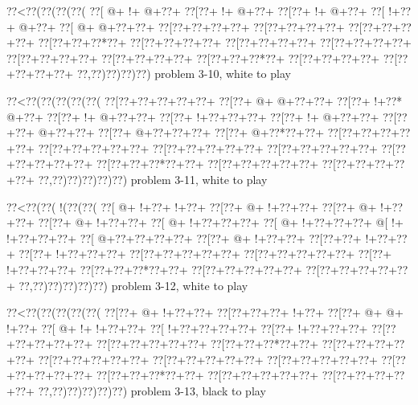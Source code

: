 \vbox{\vbox{\goo
\0??<\0??(\0??(\0??(\0??(
\0??[\- @+\- !+\- @+\0??+
\0??[\0??+\- !+\- @+\0??+
\0??[\0??+\- !+\- @+\0??+
\0??[\- !+\0??+\- @+\0??+
\0??[\- @+\- @+\0??+\0??+
\0??[\0??+\0??+\0??+\0??+
\0??[\0??+\0??+\0??+\0??+
\0??[\0??+\0??+\0??+\0??+
\0??[\0??+\0??+\0??*\0??+
\0??[\0??+\0??+\0??+\0??+
\0??[\0??+\0??+\0??+\0??+
\0??[\0??+\0??+\0??+\0??+
\0??[\0??+\0??+\0??+\0??+
\0??[\0??+\0??+\0??+\0??+
\0??[\0??+\0??+\0??*\0??+
\0??[\0??+\0??+\0??+\0??+
\0??[\0??+\0??+\0??+\0??+
\0??,\0??)\0??)\0??)\0??)
}
\hfil problem 3-10, white to play\hfil\break
}

\vbox{\vbox{\goo
\0??<\0??(\0??(\0??(\0??(\0??(
\0??[\0??+\0??+\0??+\0??+\0??+
\0??[\0??+\- @+\- @+\0??+\0??+
\0??[\0??+\- !+\0??*\- @+\0??+
\0??[\0??+\- !+\- @+\0??+\0??+
\0??[\0??+\- !+\0??+\0??+\0??+
\0??[\0??+\- !+\- @+\0??+\0??+
\0??[\0??+\0??+\- @+\0??+\0??+
\0??[\0??+\- @+\0??+\0??+\0??+
\0??[\0??+\- @+\0??*\0??+\0??+
\0??[\0??+\0??+\0??+\0??+\0??+
\0??[\0??+\0??+\0??+\0??+\0??+
\0??[\0??+\0??+\0??+\0??+\0??+
\0??[\0??+\0??+\0??+\0??+\0??+
\0??[\0??+\0??+\0??+\0??+\0??+
\0??[\0??+\0??+\0??*\0??+\0??+
\0??[\0??+\0??+\0??+\0??+\0??+
\0??[\0??+\0??+\0??+\0??+\0??+
\0??,\0??)\0??)\0??)\0??)\0??)
}
\hfil problem 3-11, white to play\hfil\break
}

\vbox{\vbox{\goo
\0??<\0??(\0??(\- !(\0??(\0??(
\0??[\- @+\- !+\0??+\- !+\0??+
\0??[\0??+\- @+\- !+\0??+\0??+
\0??[\0??+\- @+\- !+\0??+\0??+
\0??[\0??+\- @+\- !+\0??+\0??+
\0??[\- @+\- !+\0??+\0??+\0??+
\0??[\- @+\- !+\0??+\0??+\0??+
\- @[\- !+\- !+\0??+\0??+\0??+
\0??[\- @+\0??+\0??+\0??+\0??+
\0??[\0??+\- @+\- !+\0??+\0??+
\0??[\0??+\0??+\- !+\0??+\0??+
\0??[\0??+\- !+\0??+\0??+\0??+
\0??[\0??+\0??+\0??+\0??+\0??+
\0??[\0??+\0??+\0??+\0??+\0??+
\0??[\0??+\- !+\0??+\0??+\0??+
\0??[\0??+\0??+\0??*\0??+\0??+
\0??[\0??+\0??+\0??+\0??+\0??+
\0??[\0??+\0??+\0??+\0??+\0??+
\0??,\0??)\0??)\0??)\0??)\0??)
}
\hfil problem 3-12, white to play\hfil\break
}

\vbox{\vbox{\goo
\0??<\0??(\0??(\0??(\0??(\0??(
\0??[\0??+\- @+\- !+\0??+\0??+
\0??[\0??+\0??+\0??+\- !+\0??+
\0??[\0??+\- @+\- @+\- !+\0??+
\0??[\- @+\- !+\- !+\0??+\0??+
\0??[\- !+\0??+\0??+\0??+\0??+
\0??[\0??+\- !+\0??+\0??+\0??+
\0??[\0??+\0??+\0??+\0??+\0??+
\0??[\0??+\0??+\0??+\0??+\0??+
\0??[\0??+\0??+\0??*\0??+\0??+
\0??[\0??+\0??+\0??+\0??+\0??+
\0??[\0??+\0??+\0??+\0??+\0??+
\0??[\0??+\0??+\0??+\0??+\0??+
\0??[\0??+\0??+\0??+\0??+\0??+
\0??[\0??+\0??+\0??+\0??+\0??+
\0??[\0??+\0??+\0??*\0??+\0??+
\0??[\0??+\0??+\0??+\0??+\0??+
\0??[\0??+\0??+\0??+\0??+\0??+
\0??,\0??)\0??)\0??)\0??)\0??)
}
\hfil problem 3-13, black to play\hfil\break
}

